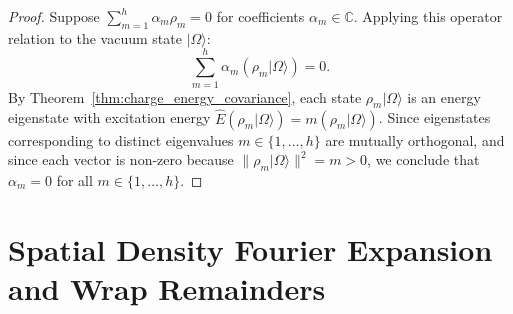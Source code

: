 \begin{proof}
Suppose $\sum_{m=1}^h \alpha_m \rho_m = 0$ for coefficients $\alpha_m \in \mathbb{C}$. Applying this operator relation to the vacuum state $|\Omega\rangle$:
\[
\sum_{m=1}^h \alpha_m (\rho_m |\Omega\rangle) = 0.
\]
By Theorem~\ref{thm:charge_energy_covariance}, each state $\rho_m |\Omega\rangle$ is an energy eigenstate with excitation energy $\hat{E}(\rho_m |\Omega\rangle) = m (\rho_m |\Omega\rangle)$.
Since eigenstates corresponding to distinct eigenvalues $m \in \{1, \dots, h\}$ are mutually orthogonal, and since each vector is non-zero because $\|\rho_m |\Omega\rangle\|^2 = m > 0$, we conclude that $\alpha_m = 0$ for all $m \in \{1, \dots, h\}$.
\end{proof}

\section{Spatial Density Fourier Expansion and Wrap Remainders}

